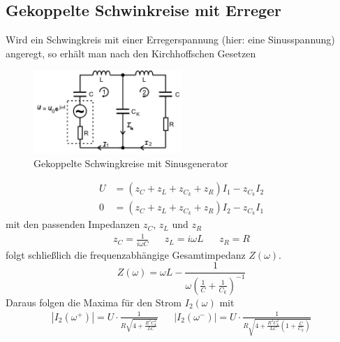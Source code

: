 \subsection{Gekoppelte Schwinkreise mit Erreger}
Wird ein Schwingkreis mit einer Erregerspannung (hier: eine Sinusspannung) angeregt,
so erhält man nach den Kirchhoffschen Gesetzen
\begin{figure}[H]
    \centering
    \includegraphics[width=0.5\textwidth]{bilder/schwingkreis_sinus.jpg}
    \caption{Gekoppelte Schwingkreise mit Sinusgenerator \cite[303]{Anleitung}}
\end{figure} 
\begin{align}
    U&=\left(z_C+z_L+z_{C_k}+z_R\right)I_1-z_{C_k}I_2 \label{schw1}\\
    0&=\left(z_C+z_L+z_{C_k}+z_R\right)I_2-z_{C_k}I_1 \label{schw2}
\end{align}
mit den passenden Impedanzen $z_C$, $z_L$ und $z_R$
\begin{align*}
    z_C=\frac{1}{i\omega C}&
    &z_L=i \omega L&
    &z_R=R
\end{align*}
folgt schließlich die frequenzabhängige Gesamtimpedanz $Z\left(\omega\right)$.
\begin{equation}
    Z\left(\omega\right)=\omega L -\frac{1}{\omega\left(\frac{1}{C}+\frac{1}{C_k}\right)^{-1}}
\end{equation}
Daraus folgen die Maxima für den Strom $I_2\left(\omega\right)$ mit
\begin{align}
    |I_2(\omega^+)|=U\cdot\frac{1}{R\sqrt{4+\frac{R^2C_k^2}{LC}}}&&
    |I_2(\omega^-)|=U\cdot\frac{1}{R\sqrt{4+\frac{R^2C_k^2}{LC}(1+\frac{C}{C_k})}}
    \label{eqn:StromI}
\end{align}

\label{sec:theorie}